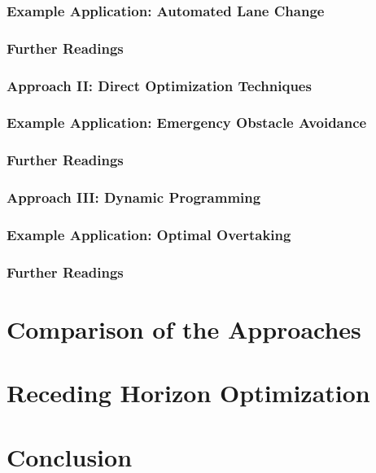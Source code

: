 \subsubsection{Example Application: Automated Lane Change}\label{sec:example_application_ALC}

\subsubsection{Further Readings}


\subsubsection{Approach II: Direct Optimization Techniques}

\subsubsection{Example Application: Emergency Obstacle Avoidance}

\subsubsection{Further Readings}

\subsubsection{Approach III: Dynamic Programming}

\subsubsection{Example Application: Optimal Overtaking}

\subsubsection{Further Readings}


\section{Comparison of the Approaches}

\section{Receding Horizon Optimization}\label{S:xx}

\section{Conclusion}\label{S:yy}











